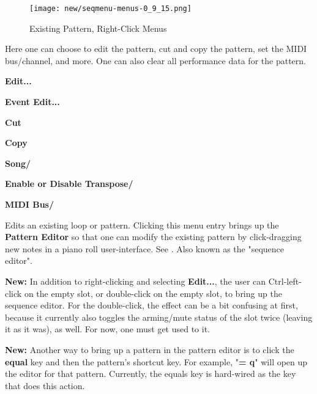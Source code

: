 \begin{figure}[H]
   \centering 
   \texttt{[image: new/seqmenu-menus-0\_9\_15.png]}
   \caption{Existing Pattern, Right-Click Menus}
   \label{fig:pattern_window_right_click}
\end{figure}

   Here one can choose to edit the pattern, cut and copy the pattern,
   set the MIDI bus/channel, and more.
   One can also clear all performance data for the pattern.
   
   \begin{enumber}
      \item \textbf{Edit...}
      \item \textbf{Event Edit...}
      \item \textbf{Cut}
      \item \textbf{Copy}
      \item \textbf{Song/}
      \item \textbf{Enable or Disable Transpose/}
      \item \textbf{MIDI Bus/}
   \end{enumber}

   \setcounter{ItemCounter}{0}      %

   Edits an existing loop or pattern.
   Clicking this menu entry brings up the \textbf{Pattern Editor}
   so that one can modify the existing pattern by click-dragging new notes in a
   piano roll user-interface.
   See .
   Also known as the "sequence editor".

   \textbf{New:}
   In addition to right-clicking and selecting \textbf{Edit...}, the user
   can Ctrl-left-click on the empty slot, or
   double-click on the empty slot, to bring up the sequence
   editor.  For the double-click, the effect can be a bit confusing at first,
   because it currently also toggles the arming/mute status of the slot
   twice (leaving it as it was), as well.  For now, one must get used to it.

   \textbf{New:}
   Another way to bring up a pattern in the pattern editor is to
   click the \textbf{equal} key and then the pattern's shortcut key.
   For example, "\textbf{= q}" will open up the editor for that pattern.
   Currently, the equals key is hard-wired as the key that does this action.

